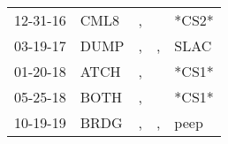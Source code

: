 \begin{supertabular}{lllll}
 12-31-16 &  CML8 &  , &    &  *CS2* \\
 03-19-17 &  DUMP &  , &  , &   SLAC \\
 01-20-18 &  ATCH &  , &    &  *CS1* \\
 05-25-18 &  BOTH &  , &    &  *CS1* \\
 10-19-19 &  BRDG &  , &  , &   peep \\
\end{supertabular}
